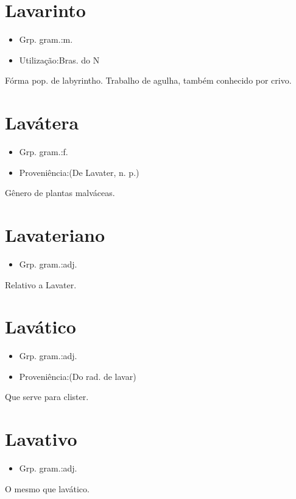 \section{Lavarinto}
\begin{itemize}
\item {Grp. gram.:m.}
\end{itemize}
\begin{itemize}
\item {Utilização:Bras. do N}
\end{itemize}
Fórma pop. de \textunderscore labyrintho\textunderscore .
Trabalho de agulha, também conhecido por \textunderscore crivo\textunderscore .
\section{Lavátera}
\begin{itemize}
\item {Grp. gram.:f.}
\end{itemize}
\begin{itemize}
\item {Proveniência:(De \textunderscore Lavater\textunderscore , n. p.)}
\end{itemize}
Gênero de plantas malváceas.
\section{Lavateriano}
\begin{itemize}
\item {Grp. gram.:adj.}
\end{itemize}
Relativo a Lavater.
\section{Lavático}
\begin{itemize}
\item {Grp. gram.:adj.}
\end{itemize}
\begin{itemize}
\item {Proveniência:(Do rad. de \textunderscore lavar\textunderscore )}
\end{itemize}
Que serve para clister.
\section{Lavativo}
\begin{itemize}
\item {Grp. gram.:adj.}
\end{itemize}
O mesmo que \textunderscore lavático\textunderscore .
